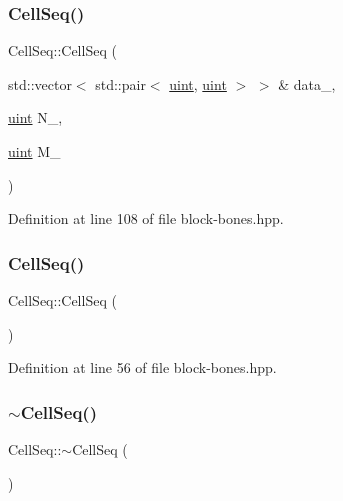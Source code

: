 \subsubsection{\texorpdfstring{Cell\+Seq()}{CellSeq()}\hspace{0.1cm}{\footnotesize\ttfamily [1/2]}}
{\footnotesize\ttfamily Cell\+Seq\+::\+Cell\+Seq (\begin{DoxyParamCaption}\item[{std\+::vector$<$ std\+::pair$<$ \hyperlink{typedefs_8hpp_a91ad9478d81a7aaf2593e8d9c3d06a14}{uint}, \hyperlink{typedefs_8hpp_a91ad9478d81a7aaf2593e8d9c3d06a14}{uint} $>$ $>$ \&}]{data\+\_\+,  }\item[{\hyperlink{typedefs_8hpp_a91ad9478d81a7aaf2593e8d9c3d06a14}{uint}}]{N\+\_\+,  }\item[{\hyperlink{typedefs_8hpp_a91ad9478d81a7aaf2593e8d9c3d06a14}{uint}}]{M\+\_\+ }\end{DoxyParamCaption})\hspace{0.3cm}{\ttfamily [inline]}}



Definition at line 108 of file block-\/bones.\+hpp.

\mbox{\label{class_cell_seq_a92513554c453533b27ebcc1486452a00}} 
\subsubsection{\texorpdfstring{Cell\+Seq()}{CellSeq()}\hspace{0.1cm}{\footnotesize\ttfamily [2/2]}}
{\footnotesize\ttfamily Cell\+Seq\+::\+Cell\+Seq (\begin{DoxyParamCaption}{ }\end{DoxyParamCaption})\hspace{0.3cm}{\ttfamily [inline]}}



Definition at line 56 of file block-\/bones.\+hpp.

\mbox{\label{class_cell_seq_a1ed463a49ab2ea5f1ff704b74eb68515}} 
\subsubsection{\texorpdfstring{$\sim$\+Cell\+Seq()}{~CellSeq()}}
{\footnotesize\ttfamily Cell\+Seq\+::$\sim$\+Cell\+Seq (\begin{DoxyParamCaption}{ }\end{DoxyParamCaption})\hspace{0.3cm}{\ttfamily [inline]}}



